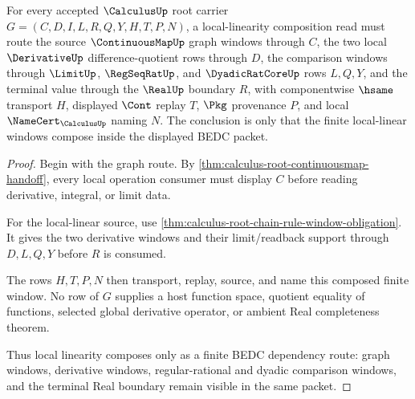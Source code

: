 \begin{theorem}
\label{thm:calculus-root-local-linearity-composition}
For every accepted $\CalculusUp$ root carrier $G=(C,D,I,L,R,Q,Y,H,T,P,N)$, a local-linearity composition read must route the source $\ContinuousMapUp$ graph windows through $C$, the two local $\DerivativeUp$ difference-quotient rows through $D$, the comparison windows through $\LimitUp$, $\RegSeqRatUp$, and $\DyadicRatCoreUp$ rows $L,Q,Y$, and the terminal value through the $\RealUp$ boundary $R$, with componentwise $\hsame$ transport $H$, displayed $\Cont$ replay $T$, $\Pkg$ provenance $P$, and local $\NameCert_{\CalculusUp}$ naming $N$. The conclusion is only that the finite local-linear windows compose inside the displayed BEDC packet.
\end{theorem}
\begin{proof}
Begin with the graph route. By \autoref{thm:calculus-root-continuousmap-handoff}, every local operation consumer must display $C$ before reading derivative, integral, or limit data.

For the local-linear source, use \autoref{thm:calculus-root-chain-rule-window-obligation}. It gives the two derivative windows and their limit/readback support through $D,L,Q,Y$ before $R$ is consumed.

The rows $H,T,P,N$ then transport, replay, source, and name this composed finite window. No row of $G$ supplies a host function space, quotient equality of functions, selected global derivative operator, or ambient Real completeness theorem.

Thus local linearity composes only as a finite BEDC dependency route: graph windows, derivative windows, regular-rational and dyadic comparison windows, and the terminal Real boundary remain visible in the same packet.
\end{proof}

